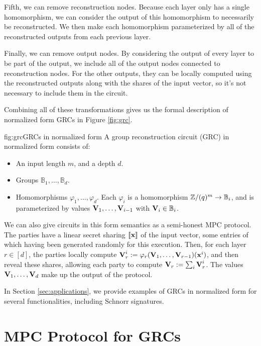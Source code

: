 Fifth, we can remove reconstruction nodes.
Because each layer only has a single homomorphism, we can consider
the output of this homomorphism to necessarily be reconstructed.
We then make each homomorphism parameterized by all of the reconstructed
outputs from each previous layer.

Finally, we can remove output nodes.
By considering the output of every layer to be part of the output,
we include all of the output nodes connected to reconstruction nodes.
For the other outputs, they can be locally computed using the reconstructed
outputs along with the shares of the input vector, so it's not necessary
to include them in the circuit.

Combining all of these transformations gives us the formal description of normalized form
GRCs in Figure \ref{fig:grc}.

\begin{afigure}{fig:grc}{GRCs in normalized form}
A group reconstruction circuit (GRC) in normalized form consists of:
\begin{itemize}
    \item An input length $m$, and a depth $d$.
    \item Groups $\mathbb{B}_1, \ldots, \mathbb{B}_d$.
    \item Homomorphisms $\varphi_1, \ldots, \varphi_d$. Each $\varphi_i$
    is a homomorphism $\mathbb{Z}/(q)^m \to \mathbb{B}_i$, and is parameterized
    by values $\textbf{V}_1, \ldots, \textbf{V}_{i - 1}$ with $\textbf{V}_i \in \mathbb{B}_i$.
\end{itemize}
\end{afigure}

We can also give circuits in this form semantics
as a semi-honest MPC protocol.
The parties have a linear secret sharing $\llbracket\textbf{x}\rrbracket$ of
the input vector, some entries of which having been generated randomly
for this execution.
Then, for each layer $r \in [d]$, the parties locally
compute ${}\textbf{V}_r^i := \varphi_r(\textbf{V}_1, \ldots, \textbf{V}_{r - 1})(\textbf{x}^i)$,
and then reveal these shares, allowing each party to compute
$\textbf{V}_r := \sum_i \textbf{V}_r^i$.
The values $\textbf{V}_1, \ldots, \textbf{V}_d$ make up the output of the protocol.

In Section \ref{sec:applications}, we provide examples of GRCs
in normalized form for several functionalities, including Schnorr
signatures.

\section{MPC Protocol for GRCs}
\label{sec:mpc_prot}


